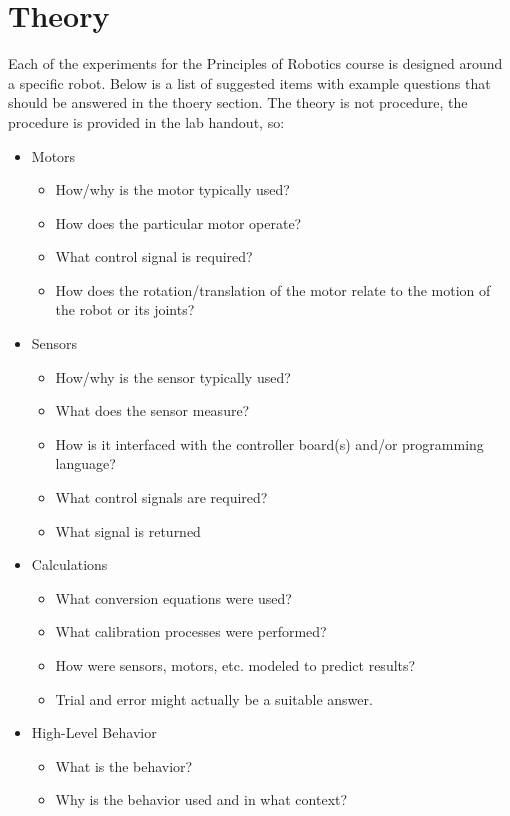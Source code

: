 \documentclass[12pt]{article}
\begin{document}
\section*{Theory}
Each of the experiments for the Principles of Robotics course is designed around a specific robot. Below is a list of suggested items with example questions that should be answered in the thoery section. The theory is not procedure, the procedure is provided in the lab handout, so:
\begin{itemize}
    \item Motors
    \begin{itemize}
        \item How/why is the motor typically used?
        \item How does the particular motor operate?
        \item What control signal is required?
        \item How does the rotation/translation of the motor relate to the motion of the robot or its joints?
    \end{itemize}
    \newpage
    \item Sensors
    \begin{itemize}
        \item How/why is the sensor typically used?
        \item What does the sensor measure?
        \item How is it interfaced with the controller board(s) and/or programming language?
        \item What control signals are required?
        \item What signal is returned
    \end{itemize}
    \item Calculations
    \begin{itemize}
        \item What conversion equations were used?
        \item What calibration processes were performed?
        \item How were sensors, motors, etc. modeled to predict results?
        \item Trial and error might actually be a suitable answer.
    \end{itemize}
    \item High-Level Behavior
    \begin{itemize}
        \item What is the behavior?
        \item Why is the behavior used and in what context?

\end{itemize}
\end{itemize}
\end{document}
